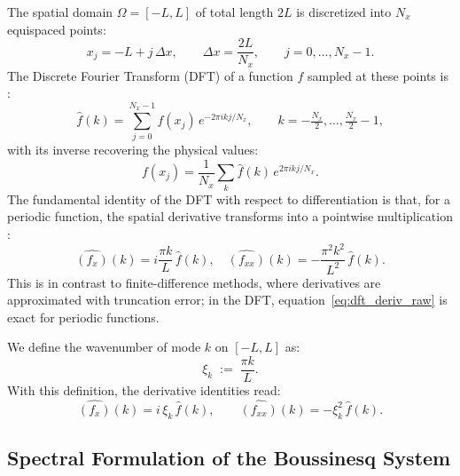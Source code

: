 The spatial domain $\Omega = [-L, L]$ of total length $2L$ is discretized into $N_x$ equispaced points:
\begin{equation}\label{eq:grid}
    x_j = -L + j\,\Delta x, \qquad \Delta x = \frac{2L}{N_x},
    \qquad j = 0, \ldots, N_x - 1.
\end{equation}
The Discrete Fourier Transform (DFT) of a function $f$ sampled at these points is \parencite{trefethen2000}:
\begin{equation}\label{eq:dft}
    \hat{f}(k) = \sum_{j=0}^{N_x-1} f(x_j)\, e^{-2\pi i k j / N_x},
    \qquad k = -\tfrac{N_x}{2}, \ldots, \tfrac{N_x}{2} - 1,
\end{equation}
with its inverse recovering the physical values:
\begin{equation}\label{eq:idft}
    f(x_j) = \frac{1}{N_x} \sum_{k} \hat{f}(k)\, e^{2\pi i k j / N_x}.
\end{equation}
The fundamental identity of the DFT with respect to differentiation is that, for a periodic function, the spatial derivative transforms into a pointwise multiplication \parencite{trefethen2000, engsigkarup2012}:
\begin{equation}\label{eq:dft_deriv_raw}
    \widehat{(f_x)}(k) = i \frac{\pi k}{L}\, \hat{f}(k), \quad
    \widehat{(f_{xx})}(k) = -\frac{\pi^2 k^2}{L^2}\, \hat{f}(k).
\end{equation}
This is in contrast to finite-difference methods, where derivatives are approximated with truncation error; in the DFT, equation~\eqref{eq:dft_deriv_raw} is exact for periodic functions.

We define the wavenumber of mode $k$ on $[-L,L]$ as:
\begin{equation}\label{eq:xi_def}
    \xi_k \;:=\; \frac{\pi k}{L}.
\end{equation}
With this definition, the derivative identities read:
\begin{equation}\label{eq:dft_deriv}
    \widehat{(f_x)}(k) = i\,\xi_k\,\hat{f}(k), \qquad
    \widehat{(f_{xx})}(k) = -\xi_k^2\,\hat{f}(k).
\end{equation}

\subsection{Spectral Formulation of the Boussinesq System}
\label{subsec:spectral_bou}

